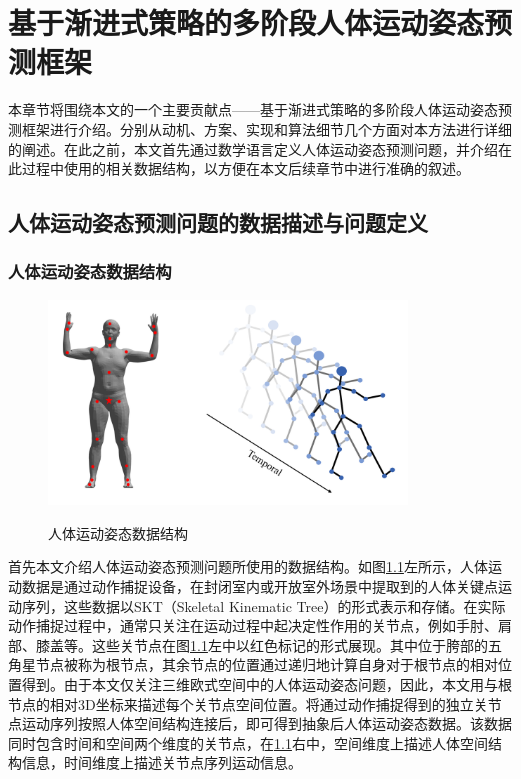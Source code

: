 \chapter{基于渐进式策略的多阶段人体运动姿态预测框架}\label{chapter-5}
本章节将围绕本文的一个主要贡献点——基于渐进式策略的多阶段人体运动姿态预测框架进行介绍。分别从动机、方案、实现和算法细节几个方面对本方法进行详细的阐述。在此之前，本文首先通过数学语言定义人体运动姿态预测问题，并介绍在此过程中使用的相关数据结构，以方便在本文后续章节中进行准确的叙述。
\section{人体运动姿态预测问题的数据描述与问题定义}
\subsection{人体运动姿态数据结构}
\begin{figure}[ht]
    \centering
    \includegraphics[width=0.85\textwidth]{FigMa/show_structure.png}\\
    \vspace{-0.3cm}
    \caption{人体运动姿态数据结构}
    \label{fig:data_structure}
\end{figure}
首先本文介绍人体运动姿态预测问题所使用的数据结构。如图\ref{fig:data_structure}左所示，人体运动数据是通过动作捕捉设备，在封闭室内或开放室外场景中提取到的人体关键点运动序列，这些数据以SKT（Skeletal Kinematic Tree）的形式表示和存储。在实际动作捕捉过程中，通常只关注在运动过程中起决定性作用的关节点，例如手肘、肩部、膝盖等。这些关节点在图\ref{fig:data_structure}左中以红色标记的形式展现。其中位于胯部的五角星节点被称为根节点，其余节点的位置通过递归地计算自身对于根节点的相对位置得到。由于本文仅关注三维欧式空间中的人体运动姿态问题，因此，本文用与根节点的相对3D坐标来描述每个关节点空间位置。将通过动作捕捉得到的独立关节点运动序列按照人体空间结构连接后，即可得到抽象后人体运动姿态数据。该数据同时包含时间和空间两个维度的关节点，在\ref{fig:data_structure}右中，空间维度上描述人体空间结构信息，时间维度上描述关节点序列运动信息。

